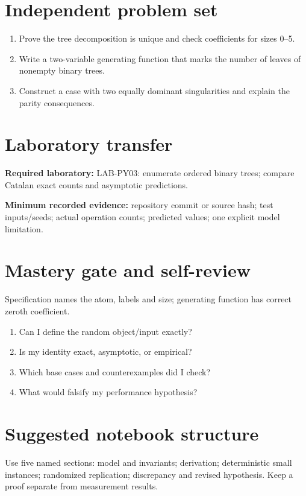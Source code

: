 \documentclass[11pt]{article}
\begin{document}
\section{Independent problem set}
\begin{enumerate}
\item Prove the tree decomposition is unique and check coefficients for sizes 0--5.
\item Write a two-variable generating function that marks the number of leaves of nonempty binary trees.
\item Construct a case with two equally dominant singularities and explain the parity consequences.
\end{enumerate}
\section{Laboratory transfer}
\textbf{Required laboratory:} LAB-PY03: enumerate ordered binary trees; compare Catalan exact counts and asymptotic predictions.\par
\noindent\textbf{Minimum recorded evidence:} repository commit or source hash; test inputs/seeds; actual operation counts; predicted values; one explicit model limitation.\par
\section{Mastery gate and self-review}
Specification names the atom, labels and size; generating function has correct zeroth coefficient.\par
\begin{enumerate}\item Can I define the random object/input exactly? \item Is my identity exact, asymptotic, or empirical? \item Which base cases and counterexamples did I check? \item What would falsify my performance hypothesis?\end{enumerate}
\section{Suggested notebook structure}
Use five named sections: model and invariants; derivation; deterministic small instances; randomized replication; discrepancy and revised hypothesis. Keep a proof separate from measurement results.
\end{document}
